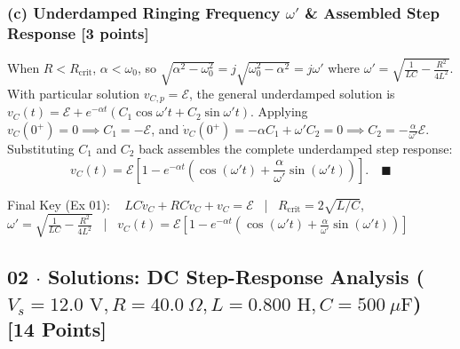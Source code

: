 \documentclass[10pt,letterpaper]{article}
\begin{document}
  \subsubsection*{(c) Underdamped Ringing Frequency $\omega'$ \& Assembled Step Response [3 points]}
  When $R < R_{\text{crit}}$, $\alpha < \omega_0$, so $\sqrt{\alpha^2 - \omega_0^2} = j\sqrt{\omega_0^2 - \alpha^2} = j\omega'$ where $\omega' = \sqrt{\frac{1}{LC} - \frac{R^2}{4L^2}}$. With particular solution $v_{C,p} = \mathcal{E}$, the general underdamped solution is $v_C(t) = \mathcal{E} + e^{-\alpha t}(C_1\cos\omega' t + C_2\sin\omega' t)$. Applying $v_C(0^+)=0 \implies C_1 = -\mathcal{E}$, and $\dot{v}_C(0^+) = -\alpha C_1 + \omega' C_2 = 0 \implies C_2 = -\frac{\alpha}{\omega'}\mathcal{E}$. Substituting $C_1$ and $C_2$ back assembles the complete underdamped step response:
  $$v_C(t) = \mathcal{E}\left[1 - e^{-\alpha t}\left(\cos(\omega' t) + \frac{\alpha}{\omega'}\sin(\omega' t)\right)\right]. \quad \blacksquare$$

Final Key (Ex 01): ~ $LC\ddot{v}_C + RC\dot{v}_C + v_C = \mathcal{E}$ ~|~ $R_{\text{crit}} = 2\sqrt{L/C}$, ~ $\omega' = \sqrt{\frac{1}{LC} - \frac{R^2}{4L^2}}$ ~|~ $v_C(t) = \mathcal{E}\left[1 - e^{-\alpha t}\left(\cos(\omega' t) + \frac{\alpha}{\omega'}\sin(\omega' t)\right)\right]$


\newpage



\subsection*{02 $\cdot$ Solutions: DC Step-Response Analysis ($V_s=12.0\text{ V}, R=40.0\ \Omega, L=0.800\text{ H}, C=500\ \mu\text{F}$) \hfill [14 Points]}
\end{document}
